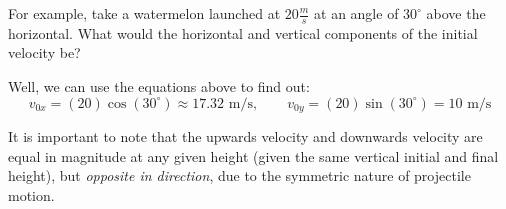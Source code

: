 \begin{center}
\end{center}

For example, take a watermelon launched at $20 \frac{m}{s}$ at an angle of $30^\circ$ above the horizontal. What would the horizontal and vertical components of the initial velocity be?

Well, we can use the equations above to find out:
$$
v_{0x} = (20) \cos(30^\circ) \approx 17.32 \text{ m/s}, \qquad v_{0y} = (20) \sin(30^\circ) = 10 \text{ m/s}
$$

It is important to note that the upwards velocity and downwards velocity are equal in magnitude at any given height (given the same vertical initial and final height), but \emph{opposite in direction}, due to the symmetric nature of projectile motion.

